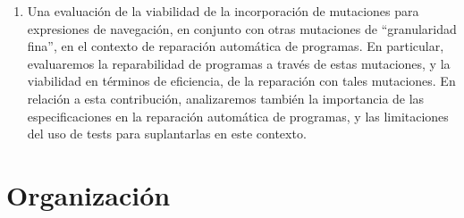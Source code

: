 \begin{enumerate}
    \item Una evaluaci\'on de la viabilidad de la incorporaci\'on de mutaciones para expresiones de navegaci\'on, en conjunto con otras mutaciones de ``granularidad fina'', en el contexto de reparaci\'on autom\'atica de programas. En particular, evaluaremos la reparabilidad de programas a trav\'es de estas mutaciones, y la viabilidad en t\'erminos de eficiencia, de la reparaci\'on con tales mutaciones. En relaci\'on a esta contribuci\'on, analizaremos tambi\'en la importancia de las especificaciones en la reparaci\'on autom\'atica de programas, y las limitaciones del uso de tests para suplantarlas en este contexto. 
 
\end{enumerate}




\section{Organizaci\'on}
\label{sec:intro.organizacion}

